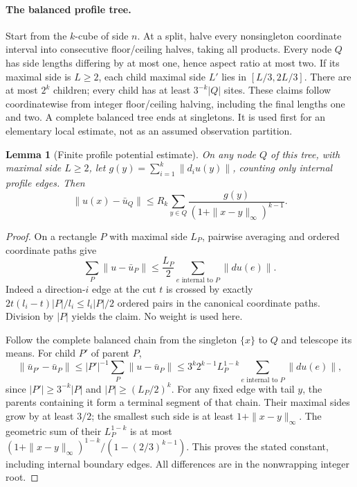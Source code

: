 \documentclass[11pt]{article}
\newtheorem{lemma}{Lemma}
\begin{document}
\paragraph{The balanced profile tree.}
Start from the $k$-cube of side $n$. At a split, halve every nonsingleton coordinate interval into consecutive floor/ceiling halves, taking all products. Every node $Q$ has side lengths differing by at most one, hence aspect ratio at most two. If its maximal side is $L\ge2$, each child maximal side $L'$ lies in $[L/3,2L/3]$. There are at most $2^k$ children; every child has at least $3^{-k}|Q|$ sites. These claims follow coordinatewise from integer floor/ceiling halving, including the final lengths one and two. A complete balanced tree ends at singletons. It is used first for an elementary local estimate, not as an assumed observation partition.

\begin{lemma}[Finite profile potential estimate]\label{lem:potential}
On any node $Q$ of this tree, with maximal side $L\ge2$, let
$g(y)=\sum_{i=1}^k\|d_i u(y)\|$, counting only internal profile edges. Then
\[
 \|u(x)-\bar u_Q\|\le R_k\sum_{y\in Q}
 \frac{g(y)}{(1+\|x-y\|_\infty)^{k-1}}.
\]
\end{lemma}
\begin{proof}
On a rectangle $P$ with maximal side $L_P$, pairwise averaging and ordered coordinate paths give
\[
 \sum_P\|u-\bar u_P\|\le\frac{L_P}{2}\sum_{e\text{ internal to }P}\|du(e)\|.
\]
Indeed a direction-$i$ edge at the cut $t$ is crossed by exactly
$2t(l_i-t)|P|/l_i\le l_i|P|/2$ ordered pairs in the canonical coordinate paths. Division by $|P|$ yields the claim. No weight is used here.

Follow the complete balanced chain from the singleton $\{x\}$ to $Q$ and telescope its means. For child $P'$ of parent $P$,
\[
 \|\bar u_{P'}-\bar u_P\|\le |P'|^{-1}\sum_P\|u-\bar u_P\|
 \le3^k2^{k-1}L_P^{1-k}\sum_{e\text{ internal to }P}\|du(e)\|,
\]
since $|P'|\ge3^{-k}|P|$ and $|P|\ge(L_P/2)^k$. For any fixed edge with tail $y$, the parents containing it form a terminal segment of that chain. Their maximal sides grow by at least $3/2$; the smallest such side is at least $1+\|x-y\|_\infty$. The geometric sum of their $L_P^{1-k}$ is at most
$(1+\|x-y\|_\infty)^{1-k}/(1-(2/3)^{k-1})$. This proves the stated constant, including internal boundary edges. All differences are in the nonwrapping integer root.
\end{proof}
\end{document}
